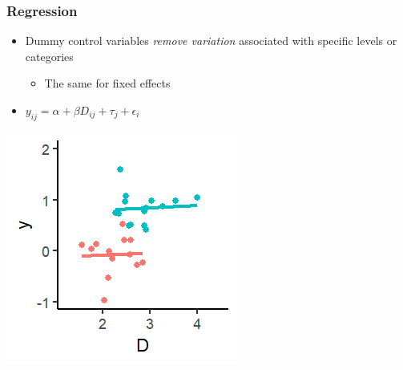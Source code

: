 \documentclass[xcolor=x11names,compress]{beamer}\usepackage[]{graphicx}\usepackage[]{color}
\makeatletter
\def\maxwidth{ %
  \ifdim\Gin@nat@width>\linewidth
    \linewidth
  \else
    \Gin@nat@width
  \fi
}
\newenvironment{knitrout}{}{} %
\renewcommand{\(}{\begin{columns}}
\renewcommand{\)}{\end{columns}}
\newcommand{\<}[1]{\begin{column}{#1}}
\renewcommand{\>}{\end{column}}
\makeatother
\begin{document}
\begin{frame}
\frametitle{Regression}
\begin{itemize}
\item Dummy control variables \textit{remove variation} associated with specific levels or categories
\begin{itemize}
\item The same for fixed effects
\end{itemize}
\item $y_{ij} = \alpha + \beta D_{ij} + \tau_j + \epsilon_i$
\end{itemize}
\begin{multicols}{2}
\begin{knitrout}
\color{fgcolor}
\includegraphics[width=\maxwidth]{figure/graph_ols_FE3-1} 

\end{knitrout}
\columnbreak
\end{multicols}
\end{frame}
\end{document}
